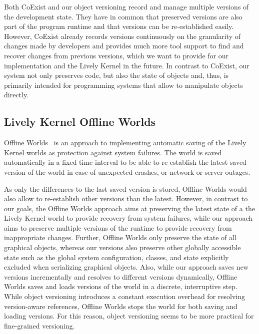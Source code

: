 Both CoExist and our object versioning record and manage multiple versions of the development state.
They have in common that preserved versions are also part of the program runtime and that versions can be re-established easily.
However, CoExist already records versions continuously on the granularity of changes made by developers and provides much more tool support to find and recover changes from previous versions, which we want to provide for our implementation and the Lively Kernel in the future.
In contrast to CoExist, our system not only preserves code, but also the state of objects and, thus, is primarily intended for programming systems that allow to manipulate objects directly.


\subsection{Lively Kernel Offline Worlds}

Offline Worlds~\cite{Czuchra2012OfW} is an approach to implementing automatic saving of the Lively Kernel worlds as protection against system failures.
The world is saved automatically in a fixed time interval to be able to re-establish the latest saved version of the world in case of unexpected crashes, or network or server outages.

As only the differences to the last saved version is stored, Offline Worlds would also allow to re-establish other versions than the latest.
However, in contrast to our goals, the Offline Worlds approach aims at preserving the latest state of a the Lively Kernel world to provide recovery from system failures, while our approach aims to preserve multiple versions of the runtime to provide recovery from inappropriate changes.
Further, Offline Worlds only preserve the state of all graphical objects, whereas our versions also preserve other globally accessible state such as the global system configuration, classes, and state explicitly excluded when serializing graphical objects.
Also, while our approach saves new versions incrementally and resolves to different versions dynamically, Offline Worlds saves and loads versions of the world in a discrete, interruptive step.
While object versioning introduces a constant execution overhead for resolving version-aware references, Offline Worlds stops the world for both saving and loading versions.
For this reason, object versioning seems to be more practical for fine-grained versioning.




